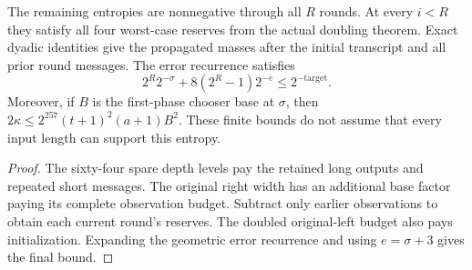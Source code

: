 \begin{theorem}
  \label{thm:lowerbounds-algebraic-affine-iteration-parameters}
  \leanok
  The remaining entropies are nonnegative through all $R$ rounds. At
  every $i<R$ they satisfy all four worst-case reserves from the actual
  doubling theorem. Exact dyadic identities give the propagated masses
  after the initial transcript and all prior round messages.
  The error recurrence satisfies
  \[
    2^R2^{-\sigma}+8(2^R-1)2^{-e}\le2^{-\mathrm{target}}.
  \]
  Moreover, if $B$ is the first-phase chooser base at $\sigma$, then
  $2\kappa\le2^{257}(t+1)^2(a+1)B^2$. These finite bounds do not assume
  that every input length can support this entropy.
\end{theorem}
\begin{proof}
  \leanok
  The sixty-four spare depth levels pay the retained long outputs and
  repeated short messages. The original right width has an additional
  base factor paying its complete observation budget. Subtract only
  earlier observations to obtain each current round's reserves. The
  doubled original-left budget also pays initialization. Expanding the
  geometric error recurrence and using $e=\sigma+3$ gives the final bound.
\end{proof}

